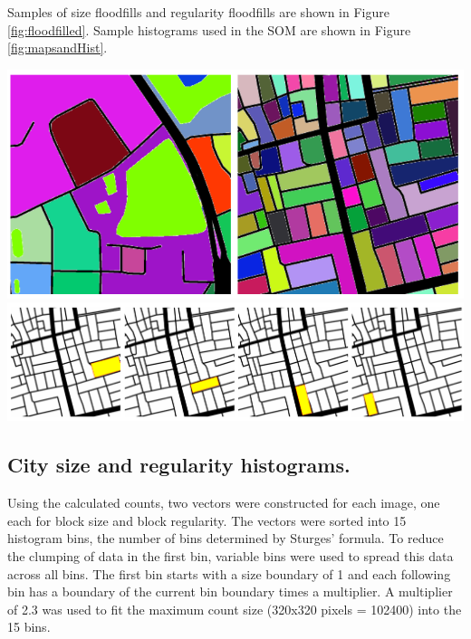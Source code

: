 \documentclass{nature}
\makeatletter
\renewenvironment*{figure}{\@float{figure}}{\end@float}
\makeatother
\begin{document}
\begin{methods}
Samples of size floodfills and regularity floodfills are shown in Figure \ref{fig:floodfilled}. Sample histograms used in the SOM are shown in Figure \ref{fig:mapsandHist}.

\begin{figure}
\centering    
\includegraphics[scale=0.8]{Images/FloodSample.png}  
\includegraphics[scale=0.8]{Images/FloodfillRegSample.png}     
\caption{\bf Results of flood filled city blocks. (Top) Floodfills of each individual region to determine size. (Bottom) Bounding boxes outlined in red, filled with yellow and count of yellow pixels used for bounding box size.}    
 \label{fig:floodfilled}  
\end{figure} 

\subsection{City size and regularity histograms.}\label{methodshist}

Using the calculated counts, two vectors were constructed for each image, one each for block size and block regularity. The vectors were sorted into 15 histogram bins, the number of bins determined by Sturges' formula\cite{Sturges1926}. To reduce the clumping of data in the first bin, variable bins were used to spread this data across all bins. The first bin starts with a size boundary of 1 and each following bin has a boundary of the current bin boundary times a multiplier. A multiplier of 2.3 was used to fit the maximum count size (320x320 pixels = 102400) into the 15 bins.


\end{methods}
\end{document}
